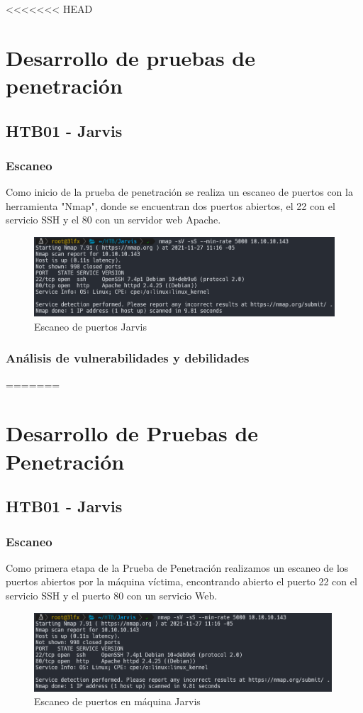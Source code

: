 <<<<<<< HEAD
\section{Desarrollo de pruebas de penetración}
\subsection{HTB01 - Jarvis}
    \subsubsection{Escaneo}
        \large{Como inicio de la prueba de penetración se realiza un escaneo de puertos con la herramienta "Nmap", donde se encuentran dos puertos abiertos, el 22 con el servicio SSH y el 80 con un servidor web Apache.}
        \par
        \begin{figure}[h!]
            \includegraphics[width=1\textwidth]{imagenes/nmap_jarvis.png} \par \vspace{0.1cm}
            \caption{Escaneo de puertos Jarvis} 
        \end{figure}
    \subsubsection{Análisis de vulnerabilidades y debilidades}
        
=======
\section{Desarrollo de Pruebas de Penetración}
\subsection{HTB01 - Jarvis}
\subsubsection{Escaneo}
Como primera etapa de la Prueba de Penetración realizamos un escaneo de los puertos abiertos por la máquina víctima, encontrando abierto el puerto 22 con el servicio SSH y el puerto 80 con un servicio Web.
\begin{figure}[H]
    \centering
    \includegraphics[width=0.99\textwidth]{imagenes/nmap_jarvis.png}
    \caption{Escaneo de puertos en máquina Jarvis}
\end{figure}
